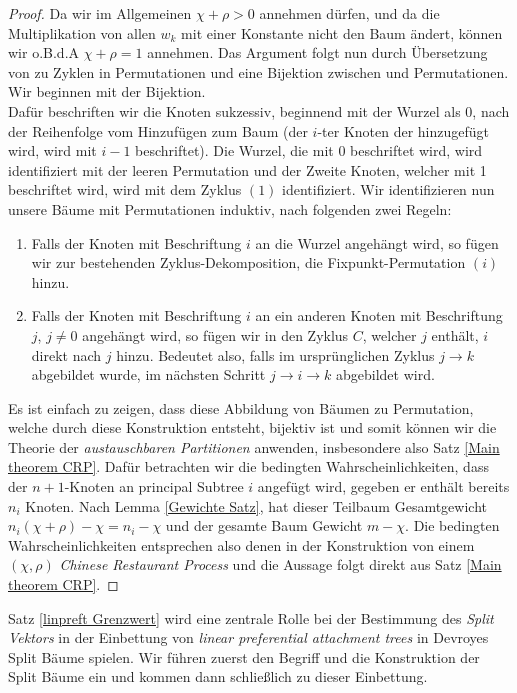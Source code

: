 \begin{proof}
    Da wir im Allgemeinen $\chi + \rho > 0 $ annehmen dürfen, und da die Multiplikation von allen $w_k$ mit einer Konstante nicht den Baum ändert, können wir o.B.d.A   $\chi + \rho = 1 $ annehmen. Das Argument folgt nun durch Übersetzung von \PsubT zu Zyklen in Permutationen und eine Bijektion zwischen \linpreft und Permutationen. Wir beginnen mit der Bijektion. \\
    Dafür beschriften wir die Knoten sukzessiv, beginnend mit der Wurzel als 0, nach der Reihenfolge vom Hinzufügen zum Baum (der $i$-ter Knoten der hinzugefügt wird, wird mit $i-1$ beschriftet). Die Wurzel, die mit 0 beschriftet wird, wird identifiziert mit der leeren Permutation und der Zweite Knoten, welcher mit 1 beschriftet wird, wird mit dem Zyklus $(1)$ identifiziert. Wir identifizieren nun unsere Bäume mit Permutationen induktiv, nach folgenden zwei Regeln:
    \begin{enumerate}
        \item Falls der Knoten mit Beschriftung $i$ an die Wurzel angehängt wird, so fügen wir zur bestehenden Zyklus-Dekomposition, die Fixpunkt-Permutation $(i)$ hinzu.
        \item Falls der Knoten mit Beschriftung $i$ an ein anderen Knoten mit Beschriftung $j$, $j \neq 0$ angehängt wird, so fügen wir in den Zyklus $C$, welcher $j$ enthält, $i$ direkt nach $j$ hinzu. Bedeutet also, falls im ursprünglichen Zyklus $j \rightarrow k$ abgebildet wurde, im nächsten Schritt $j \rightarrow i \rightarrow k$ abgebildet wird.
    \end{enumerate}
Es ist einfach zu zeigen, dass diese Abbildung von Bäumen zu Permutation, welche durch diese Konstruktion entsteht, bijektiv ist und somit können wir die Theorie der \textit{austauschbaren Partitionen} anwenden, insbesondere also Satz \ref{Main theorem CRP}. Dafür betrachten wir die bedingten Wahrscheinlichkeiten, dass der $n+1$-Knoten an principal Subtree $i$ angefügt wird, gegeben er enthält bereits $n_i$ Knoten. Nach Lemma \ref{Gewichte Satz}, hat dieser Teilbaum Gesamtgewicht $n_i(\chi + \rho) - \chi = n_i - \chi$ und der gesamte Baum Gewicht $m-\chi$. Die bedingten Wahrscheinlichkeiten entsprechen also denen in der Konstruktion von einem $(\chi,\rho)$ \textit{Chinese Restaurant Process} und die Aussage folgt direkt aus Satz \ref{Main theorem CRP}.
\end{proof}
\begin{Bemerkung}
    Satz \ref{linpreft Grenzwert} wird eine zentrale Rolle bei der Bestimmung des \textit{Split Vektors} in der Einbettung von \textit{linear preferential attachment trees} in Devroyes Split Bäume spielen. Wir führen zuerst den Begriff und die Konstruktion der Split Bäume ein und kommen dann schließlich zu dieser Einbettung.  
\end{Bemerkung}

